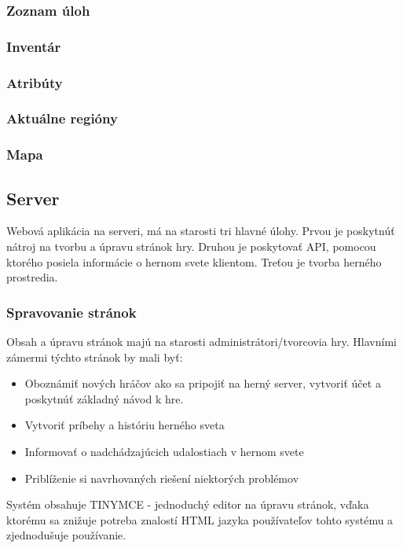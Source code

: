 \subsubsection{Zoznam úloh}


\subsubsection{Inventár}

\subsubsection{Atribúty}

\subsubsection{Aktuálne regióny}

\subsubsection{Mapa}


\subsection{Server}
Webová aplikácia na serveri, má na starosti tri hlavné úlohy. Prvou je poskytnúť nátroj na tvorbu a úpravu stránok hry. Druhou je poskytovať API, pomocou ktorého posiela informácie o hernom svete klientom. Treťou je tvorba herného prostredia.\ 

\subsubsection{Spravovanie stránok}
Obsah a úpravu stránok majú na starosti administrátori/tvorcovia hry. Hlavními zámermi týchto stránok by mali byť:
 \begin{itemize}
  \item Oboznámiť nových hráčov ako sa pripojiť na herný server, vytvoriť účet a poskytnúť základný návod k hre.
  \item Vytvoriť príbehy a históriu herného sveta 
  \item Informovať o nadchádzajúcich udalostiach v hernom svete
  \item Priblíženie si navrhovaných riešení niektorých problémov
\end{itemize}
Systém obsahuje TINYMCE - jednoduchý editor na úpravu stránok, vďaka ktorému sa znižuje potreba znalostí HTML jazyka používateľov tohto systému a zjednodušuje používanie.


